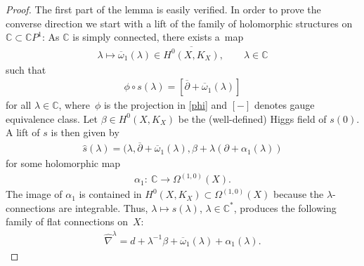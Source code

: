 \documentclass[pdftex]{sigma}
\numberwithin{equation}{section}
\begin{document}
\begin{proof}
The f\/irst part of the lemma is easily verif\/ied. In order to prove the converse direction we start with a lift of the family of holomorphic structures on ${\mathbb C} \subset {\mathbb C}P^1$: As $\mathbb C$ is simply connected, there exists a~map
\begin{gather*}
\lambda \longmapsto \overline{\omega}_1(\lambda) \in \overline{H^0(X, K_X)} , \qquad \lambda \in \mathbb C\end{gather*}
such that \begin{gather*}\phi\circ s(\lambda) = [\overline{\partial}+\overline{\omega}_1(\lambda)]\end{gather*}
for all $\lambda \in {\mathbb C}$, where~$\phi$ is the projection in \eqref{phi} and $[-]$ denotes gauge equivalence class. Let $\beta \in H^0(X, K_X)$ be the (well-def\/ined) Higgs f\/ield of $s(0)$. A lift of $s$ is then given by
\begin{gather*}\widehat{s} (\lambda) = (\lambda,\overline{\partial}+\overline{\omega}_1(\lambda), \beta+\lambda(\partial+\alpha_1(\lambda))\end{gather*}
for some holomorphic map \begin{gather*}\alpha_1 \colon \ \mathbb C \longrightarrow \Omega^{(1,0)}(X) .\end{gather*} The image of $\alpha_1$ is contained in $H^0(X, K_X) \subset \Omega^{(1,0)}(X)$ because the $\lambda$-connections are integrable. Thus, $\lambda \longmapsto s(\lambda)$, $\lambda \in \mathbb C^*$, produces the following family of f\/lat connections on~$X$:
\begin{gather*}\widehat{\nabla}^\lambda = d+\lambda^{-1}\beta+\overline{\omega}_1(\lambda)+ \alpha_1(\lambda) .\end{gather*}


\end{proof}
\end{document}
